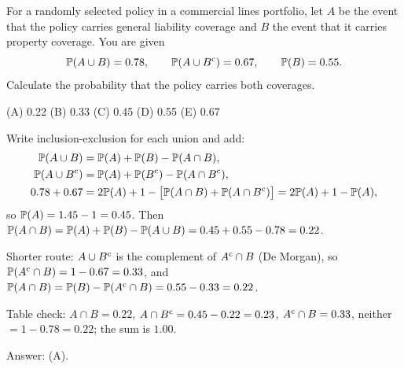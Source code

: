 \begin{example}
For a randomly selected policy in a commercial lines portfolio, let $A$ be the event
that the policy carries general liability coverage and $B$ the event that it carries
property coverage. You are given
\[
  \mathbb{P}(A \cup B) = 0.78, \qquad \mathbb{P}(A \cup B^{\mathrm{c}}) = 0.67, \qquad \mathbb{P}(B) = 0.55 .
\]
Calculate the probability that the policy carries both coverages.

(A) 0.22 \qquad (B) 0.33 \qquad (C) 0.45 \qquad (D) 0.55 \qquad (E) 0.67
\end{example}
\begin{solution}
Write inclusion-exclusion for each union and add:
\begin{align*}
  \mathbb{P}(A \cup B) &= \mathbb{P}(A) + \mathbb{P}(B) - \mathbb{P}(A \cap B), \\
  \mathbb{P}(A \cup B^{\mathrm{c}}) &= \mathbb{P}(A) + \mathbb{P}(B^{\mathrm{c}}) - \mathbb{P}(A \cap B^{\mathrm{c}}), \\
  0.78 + 0.67 &= 2\mathbb{P}(A) + 1 - \bigl[\mathbb{P}(A\cap B) + \mathbb{P}(A \cap B^{\mathrm{c}})\bigr]
               = 2\mathbb{P}(A) + 1 - \mathbb{P}(A),
\end{align*}
so $\mathbb{P}(A) = 1.45 - 1 = 0.45$. Then
$\mathbb{P}(A \cap B) = \mathbb{P}(A) + \mathbb{P}(B) - \mathbb{P}(A \cup B) = 0.45 + 0.55 - 0.78 = 0.22$.

Shorter route: $A \cup B^{\mathrm{c}}$ is the complement of $A^{\mathrm{c}} \cap B$ (De Morgan), so
$\mathbb{P}(A^{\mathrm{c}} \cap B) = 1 - 0.67 = 0.33$, and
$\mathbb{P}(A \cap B) = \mathbb{P}(B) - \mathbb{P}(A^{\mathrm{c}}\cap B) = 0.55 - 0.33 = 0.22$.

Table check: $A\cap B = 0.22$, $A \cap B^{\mathrm{c}} = 0.45 - 0.22 = 0.23$,
$A^{\mathrm{c}} \cap B = 0.33$, neither $= 1 - 0.78 = 0.22$; the sum is $1.00$.

Answer: (A).
\end{solution}


